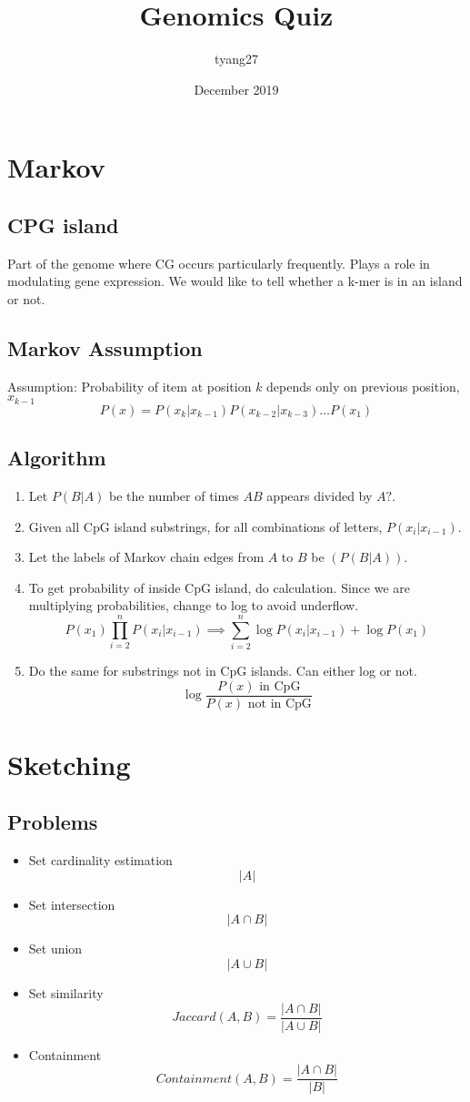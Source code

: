 \documentclass{article}
\title{Genomics Quiz}
\author{tyang27}
\date{December 2019}
\begin{document}
\maketitle
\section*{Markov}
\subsection*{CPG island}
Part of the genome where CG occurs particularly frequently. Plays a role in modulating gene expression. We would like to tell whether a k-mer is in an island or not.
\subsection*{Markov Assumption}
Assumption: Probability of item at position $k$ depends only on previous position, $x_{k-1}$
$$P(x) = P(x_k|x_{k-1})P(x_{k-2}|x_{k-3})\ldots P(x_1)$$
\subsection*{Algorithm}
\begin{enumerate}
    \item Let $P(B|A)$ be the number of times $AB$ appears divided by $A?$.
    \item Given all CpG island substrings, for all combinations of letters, $P(x_{i}|x_{i-1})$.
    \item Let the labels of Markov chain edges from $A$ to $B$ be $(P(B|A))$.
    \item To get probability of inside CpG island, do calculation. Since we are multiplying probabilities, change to log to avoid underflow.
    $$P(x_1)\prod_{i=2}^{n} P(x_{i}|x_{i-1})\implies  \sum_{i=2}^{n}\log P(x_{i}|x_{i-1}) + \log P(x_1)$$
    \item Do the same for substrings not in CpG islands. Can either log or not.
    $$\log \frac{P(x)\textrm{ in CpG}}{P(x) \textrm{ not in CpG}}$$
\end{enumerate}{}

\section*{Sketching}
\subsection*{Problems}
\begin{itemize}
    \item Set cardinality estimation
    $$|A|$$
    \item Set intersection
    $$|A\cap B|$$
    \item Set union
    $$|A\cup B|$$
    \item Set similarity
    $$Jaccard(A,B) = \frac{|A\cap B|}{|A\cup B|}$$
    \item Containment
    $$Containment(A,B) = \frac{|A\cap B|}{|B|}$$
\end{itemize}{}
\end{document}
